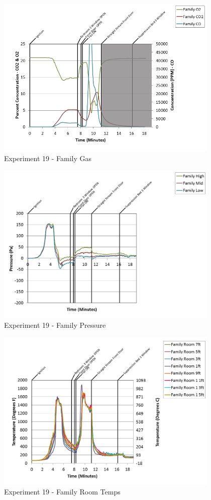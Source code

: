 \documentclass{article}
\begin{document}
\begin{appendices}
\clearpage

\begin{figure}[h!]
	\centering
	\includegraphics[height=3.05in]{0_Images/Results_Charts/Exp_19_Charts/FamilyGas.png}
	\caption{Experiment 19 - Family Gas}
\end{figure}


\begin{figure}[h!]
	\centering
	\includegraphics[height=3.05in]{0_Images/Results_Charts/Exp_19_Charts/FamilyPressure.png}
	\caption{Experiment 19 - Family Pressure}
\end{figure}

\clearpage

\begin{figure}[h!]
	\centering
	\includegraphics[height=3.05in]{0_Images/Results_Charts/Exp_19_Charts/FamilyRoomTemps.png}
	\caption{Experiment 19 - Family Room Temps}
\end{figure}



\end{appendices}
\end{document}
